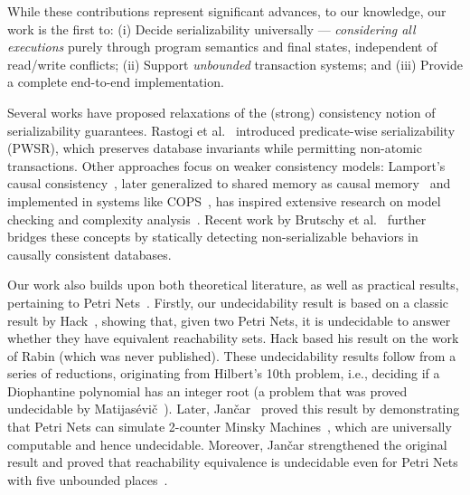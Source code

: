 %
While these contributions represent significant advances, to our knowledge, our work is the first to:
(i) Decide serializability universally --- \textit{considering all executions} purely through program semantics and final states, independent of read/write conflicts; 
(ii) Support \textit{unbounded} transaction systems; and
(iii) Provide a complete end-to-end implementation.


Several works have proposed relaxations of the (strong) consistency notion of serializability guarantees. Rastogi et al.~\cite{RaMeBrKoSi93} introduced predicate-wise serializability (PWSR), which preserves database invariants while permitting non-atomic transactions. 
%
Other approaches focus on weaker consistency models: Lamport’s causal consistency~\cite{La78}, later generalized to shared memory as causal memory~\cite{AhNeBuKoHu95} and implemented in systems like COPS~\cite{LlFrKaAn11}, has inspired extensive research on model checking and complexity analysis~\cite{BoEnGuHa17,ZeBiBoEnEr19,LaBo20}. Recent work by Brutschy et al.~\cite{BrDiMuVe18} further bridges these concepts by statically detecting non-serializable behaviors in causally consistent databases.



Our work also builds upon both theoretical literature, as well as practical results, pertaining to Petri Nets~\cite{Mu89, Es96, Reisig12}.
%
Firstly, our undecidability result is based on a classic result by Hack~\cite{Ha76, HaThesis76}, showing that, given two Petri Nets, it is undecidable to answer whether they have equivalent reachability sets. Hack based his result on the work of Rabin (which was never published). These undecidability results follow from a series of reductions, originating from Hilbert's 10th problem, i.e., deciding if a Diophantine polynomial has an integer root (a problem that was proved undecidable by Matijas{\'e}vi{\v{c}}~\cite{Ma70}).
%
Later, Jan{\v{c}}ar~\cite{Ja95} proved this result by demonstrating that Petri Nets can simulate 2-counter Minsky Machines~\cite{Mi67}, which are universally computable and hence undecidable. Moreover, Jan{\v{c}}ar strengthened the original result and proved that reachability equivalence is undecidable even for Petri Nets with five unbounded places~\cite{Ja95}.
%

